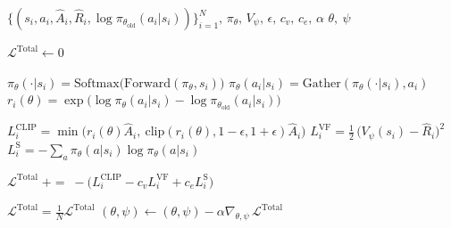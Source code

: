 \documentclass{article}
\newcommand{\coloneqq}{\mathrel{\mathop:}=}
\newcommand{\algoseparator}{
    \vspace{-0.5em}
    \centerline{\raisebox{1.25ex}{\rule{0.5cm}{0.4pt} \, \raisebox{-0.65ex}{\textbullet} \, \rule{0.5cm}{0.4pt}}}
    \vspace{-0.5em}
}
\begin{document}
\algoseparator


\begin{algorithm}
\caption*{\textbf{Algorithm 2:} Policy Gradient Update (Mini-Batch)}
\begin{algorithmic}[1]
    \Require $\{(s_i, a_i, \hat{A}_i, \hat{R}_i, \log \pi_{\theta_{\text{old}}}(a_i|s_i))\}_{i=1}^N,\, \pi_{\theta},\, V_{\psi},\, \epsilon,\, c_v,\, c_e,\, \alpha$
    \Ensure $\theta,\ \psi$

    \State $\mathcal{L}^{\text{Total}} \gets 0$ 

        \State $\pi_\theta(\cdot|s_i) = \text{Softmax}\big(\text{Forward}(\pi_{\theta}, s_i)\big)$ 
        \State $\pi_{\theta}(a_i|s_i) = \text{Gather}(\pi_\theta(\cdot|s_i), a_i)$
        \State $r_i(\theta) = \exp\!\big(\log \pi_{\theta}(a_i|s_i) - \log \pi_{\theta_{\text{old}}}(a_i|s_i)\big)$

        \State $L^{\text{CLIP}}_i = \min\!\big( r_i(\theta)\hat{A}_i,\ \text{clip}(r_i(\theta),1-\epsilon,1+\epsilon)\hat{A}_i \big)$ 
        \State $L^{\text{VF}}_i = \tfrac{1}{2}\,\big(V_{\psi}(s_i) - \hat{R}_i\big)^2$ 
        \State $L^{\text{S}}_i = - \sum_{a} \pi_{\theta}(a|s_i)\log \pi_{\theta}(a|s_i)$ 

        \State $\mathcal{L}^{\text{Total}} \;{+}{=}\; -\big(L^{\text{CLIP}}_i - c_v L^{\text{VF}}_i + c_e L^{\text{S}}_i\big)$ 
    \EndFor
    
    \State $\mathcal{L}^{\text{Total}} = \tfrac{1}{N}\mathcal{L}^{\text{Total}}$ 
    \State $(\theta,\psi) \gets (\theta,\psi) - \alpha\nabla_{\theta,\psi}\,\mathcal{L}^{\text{Total}}$
    
\end{algorithmic}
\end{algorithm}

\end{document}

